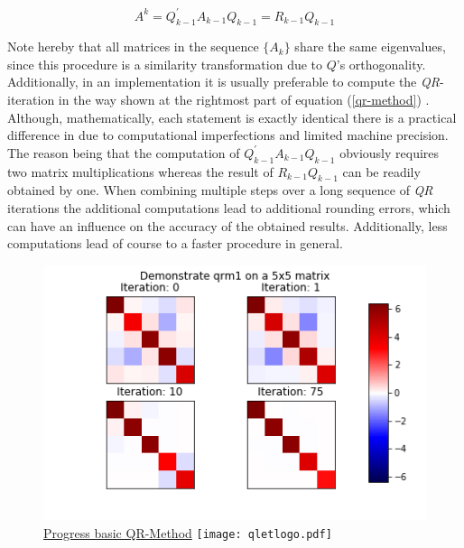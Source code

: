 \documentclass[12pt]{article}
\begin{document}
\begin{equation}
\label{qr-method}
  A^k = Q_{k-1}^{\prime} A_{k-1} Q_{k-1} = R_{k-1}Q_{k-1}
\end{equation}

Note hereby that all matrices in the sequence $\{A_k\}$ share the same eigenvalues, since this procedure is a similarity transformation due to $Q$'s orthogonality. Additionally, in an implementation it is usually preferable to compute the \textit{QR}-iteration in the way shown at the rightmost part of equation (\ref{qr-method}) \cite{NME}. Although, mathematically, each statement is exactly identical there is a practical difference in due to computational imperfections and limited machine precision. The reason being that the computation of $Q_{k-1}^{\prime} A_{k-1} Q_{k-1}$ obviously requires two matrix multiplications whereas the result of $R_{k-1}Q_{k-1}$ can be readily obtained by one. When combining multiple steps over a long sequence of \textit{QR} iterations the additional computations lead to additional rounding errors, which can have an influence on the accuracy of the obtained results. Additionally, less computations lead of course to a faster procedure in general. 

\begin{figure}
\begin{center}
\label{qrm1-plot}
\caption{\href {https://github.com/thsis/NIS18/tree/master/media/plots}{Progress basic QR-Method}  \protect\texttt{[image: qletlogo.pdf]}}
  \includegraphics[scale=0.6]{../media/plots/qrm1.png}
\end{center}
\end{figure}
\end{document}
